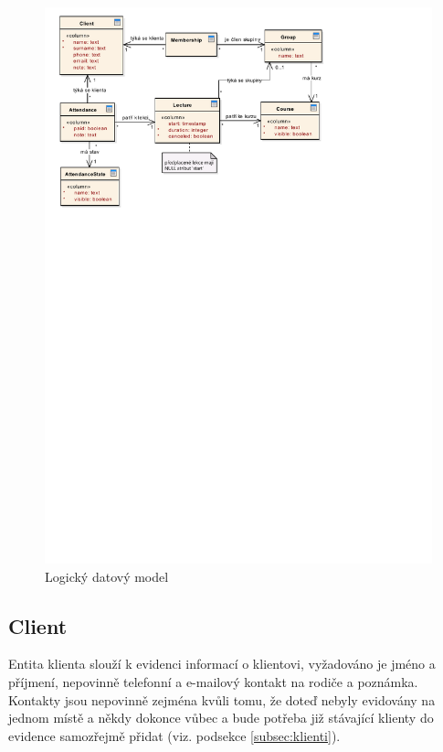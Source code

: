     \begin{figure}\centering
    	\includegraphics[width=1\textwidth]{img/db-model}
    	\caption[Logický datový model]{Logický datový model}\label{fig:db-model}
    \end{figure}
    
        \subsection{Client}
        Entita klienta slouží k evidenci informací o klientovi, vyžadováno je jméno a příjmení, nepovinně telefonní a e-mailový kontakt na rodiče a poznámka. Kontakty jsou nepovinně zejména kvůli tomu, že doteď nebyly evidovány na jednom místě a někdy dokonce vůbec a bude potřeba již stávající klienty do evidence samozřejmě přidat (viz. podsekce \ref{subsec:klienti}).
        
